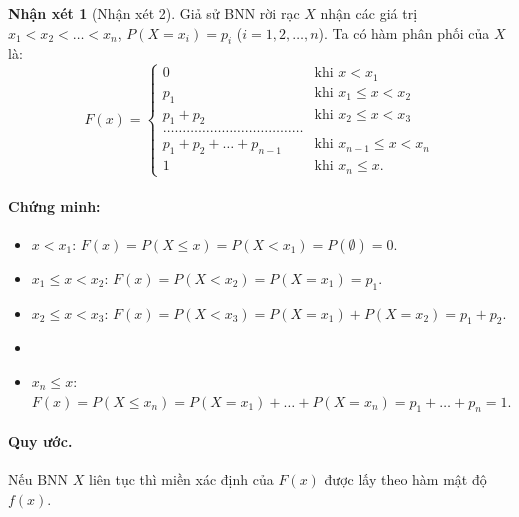 \documentclass[12pt,a4paper]{article}
\theoremstyle{definition}
\newtheorem{nhanxet}{Nhận xét}[section]
\begin{document}
\begin{nhanxet}[Nhận xét 2]
Giả sử BNN rời rạc $X$ nhận các giá trị $x_1 < x_2 < \dots < x_n$, $P(X = x_i) = p_i$ ($i = 1, 2, \dots, n$).
Ta có hàm phân phối của $X$ là:
\[
F(x) = \begin{cases}
0 & \text{khi } x < x_1 \\
p_1 & \text{khi } x_1 \le x < x_2 \\
p_1 + p_2 & \text{khi } x_2 \le x < x_3 \\
\dots\dots\dots\dots\dots\dots\dots\dots\dots\dots\dots\dots \\
p_1 + p_2 + \dots + p_{n-1} & \text{khi } x_{n-1} \le x < x_n \\
1 & \text{khi } x_n \le x.
\end{cases}
\]

\paragraph{Chứng minh:}
\begin{itemize}
    \item $x < x_1$: $F(x) = P(X \le x) = P(X < x_1) = P(\emptyset) = 0$.
    \item $x_1 \le x < x_2$: $F(x) = P(X < x_2) = P(X = x_1) = p_1$.
    \item $x_2 \le x < x_3$: $F(x) = P(X < x_3) = P(X = x_1) + P(X = x_2) = p_1 + p_2$.
    \item[\dots] \dotfill
    \item $x_n \le x$: $F(x) = P(X \le x_n) = P(X = x_1) + \dots + P(X = x_n) = p_1 + \dots + p_n = 1$.
\end{itemize}
\end{nhanxet}

\paragraph{Quy ước.} Nếu BNN $X$ liên tục thì miền xác định của $F(x)$ được lấy theo hàm mật độ $f(x)$.
\end{document}
